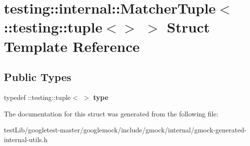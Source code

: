 \hypertarget{structtesting_1_1internal_1_1MatcherTuple_3_01_1_1testing_1_1tuple_3_4_01_4}{}\section{testing\+:\+:internal\+:\+:Matcher\+Tuple$<$ \+:\+:testing\+:\+:tuple$<$$>$ $>$ Struct Template Reference}
\label{structtesting_1_1internal_1_1MatcherTuple_3_01_1_1testing_1_1tuple_3_4_01_4}
\subsection*{Public Types}
\begin{DoxyCompactItemize}
\item 
\mbox{\label{structtesting_1_1internal_1_1MatcherTuple_3_01_1_1testing_1_1tuple_3_4_01_4_a8d4493b2b299322e6c885dee5473ebd7}} 
typedef \+::testing\+::tuple$<$ $>$ {\bfseries type}
\end{DoxyCompactItemize}


The documentation for this struct was generated from the following file\+:\begin{DoxyCompactItemize}
\item 
test\+Lib/googletest-\/master/googlemock/include/gmock/internal/gmock-\/generated-\/internal-\/utils.\+h\end{DoxyCompactItemize}
